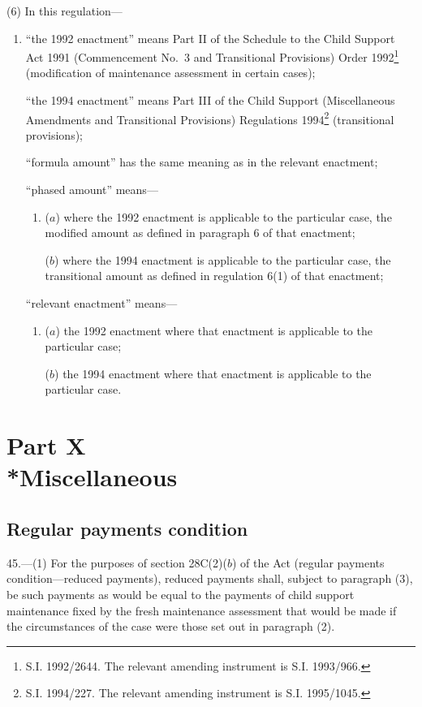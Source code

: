 \documentclass[a4paper]{article}
\newcommand{\parthead}{}
\begin{document}
(6) In this regulation—
\begin{enumerate}\item[]
“the 1992 enactment” means Part II of the Schedule to the Child Support Act 1991
(Commencement No.\ 3 and Transitional Provisions) Order 1992\footnote{\frenchspacing S.I. 1992/2644. The relevant amending instrument is S.I. 1993/966.} (modification of
maintenance assessment in certain cases);

“the 1994 enactment” means Part III of the Child Support (Miscellaneous
Amendments and Transitional Provisions) Regulations 1994\footnote{\frenchspacing S.I. 1994/227. The relevant amending instrument is S.I. 1995/1045.} (transitional
provisions);

“formula amount” has the same meaning as in the relevant enactment;

“phased amount” means—
\begin{enumerate}\item[]
($a$) where the 1992 enactment is applicable to the particular case, the modified
amount as defined in paragraph 6 of that enactment;

($b$) where the 1994 enactment is applicable to the particular case, the
transitional amount as defined in regulation 6(1) of that enactment;
\end{enumerate}

“relevant enactment” means—
\begin{enumerate}\item[]
($a$) the 1992 enactment where that enactment is applicable to the particular case;

($b$) the 1994 enactment where that enactment is applicable to the particular case.
\end{enumerate}
\end{enumerate}

\section[Part X --- Miscellaneous]{Part X\\*Miscellaneous}

\renewcommand\parthead{--- Part X}

\subsection[45. Regular payments condition]{Regular payments condition}

45.—(1) For the purposes of section
28C(2)($b$) of the Act (regular payments condition—reduced payments), reduced
payments shall, subject to paragraph (3), be such payments as would be equal to
the payments of child support maintenance fixed by the fresh maintenance
assessment that would be made if the circumstances of the case were those set
out in paragraph (2).
\end{document}
